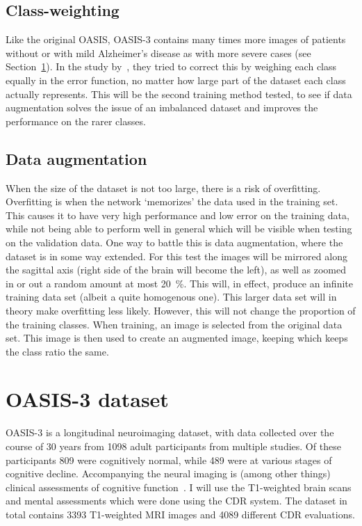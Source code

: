 \documentclass{kththesis}
\begin{document}
\subsection{Class-weighting}
Like the original OASIS, OASIS-3 contains many times more images of patients without or with mild Alzheimer's disease as with more severe cases (see Section~\ref{dataset}). In the study by~\textcite{islam2017novel}, they tried to correct this by weighing each class equally in the error function, no matter how large part of the dataset each class actually represents. This will be the second training method tested, to see if data augmentation solves the issue of an imbalanced dataset and improves the performance on the rarer classes.

\subsection{Data augmentation}
When the size of the dataset is not too large, there is a risk of overfitting. Overfitting is when the network `memorizes' the data used in the training set. This causes it to have very high performance and low error on the training data, while not being able to perform well in general which will be visible when testing on the validation data. One way to battle this is data augmentation, where the dataset is in some way extended. For this test the images will be mirrored along the sagittal axis (right side of the brain will become the left), as well as zoomed in or out a random amount at most 20~\%. This will, in effect, produce an infinite training data set (albeit a quite homogenous one). This larger data set will in theory make overfitting less likely. However, this will not change the proportion of the training classes. When training, an image is selected from the original data set. This image is then used to create an augmented image, keeping which keeps the class ratio the same.

\section{OASIS-3 dataset} \label{dataset}
OASIS-3 is a longitudinal neuroimaging dataset, with data collected over the course of 30 years from 1098 adult participants from multiple studies. Of these participants 809 were cognitively normal, while 489 were at various stages of cognitive decline. Accompanying the neural imaging is (among other things) clinical assessments of cognitive function~\cite{oasis3}. I will use the T1-weighted brain scans and mental assessments which were done using the CDR system. The dataset in total contains 3393 T1-weighted MRI images and 4089 different CDR evaluations.
\end{document}
